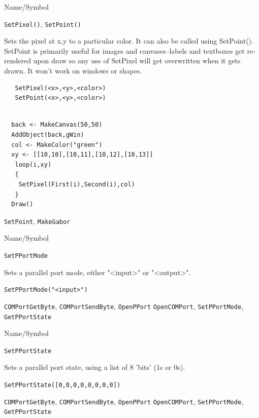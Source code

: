 \begin{desc}{Name/Symbol}
\item[Name/Symbol]	\verb+SetPixel()+, \verb+SetPoint()+

\item[Description] Sets the pixel at x,y to a particular color.  It
  can also be called using SetPoint().  SetPoint is primarily useful
  for images and canvases--labels and textboxes get re-rendered upon
  draw so any use of SetPixel will get overwritten when it gets
  drawn.  It won't work on windows or shapes.

\item[Usage]
\begin{verbatim}
   SetPixel(<x>,<y>,<color>)
   SetPoint(<x>,<y>,<color>)
\end{verbatim}

\item[Example]	
\begin{verbatim}

  back <- MakeCanvas(50,50)
  AddObject(back,gWin)
  col <- MakeColor("green")
  xy <- [[10,10],[10,11],[10,12],[10,13]]
   loop(i,xy)
   {
    SetPixel(First(i),Second(i),col)
   }
  Draw()
\end{verbatim}


\item[See Also]
  \verb+SetPoint+, \verb+MakeGabor+
\end{desc}


\begin{desc}{Name/Symbol}
\item[Name/Symbol] \verb+SetPPortMode+ 

\item[Description]  
  Sets a parallel port mode, either "<input>" or "<output>".
  
\item[Usage]       
     \verb+SetPPortMode("<input>")+ 
\item[Example]

\item[See Also]
\verb+COMPortGetByte+, \verb+COMPortSendByte+, \verb+OpenPPort+ \verb+OpenCOMPort+, \verb+SetPPortMode+, \verb+GetPPortState+ 
\end{desc} 

\begin{desc}{Name/Symbol}
\item[Name/Symbol] \verb+SetPPortState+ 

\item[Description]  
  Sets a parallel port state, using a list of 8 'bits' (1s or 0s).
  
\item[Usage]       
     \verb+SetPPortState([0,0,0,0,0,0,0,0])+ 
\item[Example]


\item[See Also]
\verb+COMPortGetByte+, \verb+COMPortSendByte+, \verb+OpenPPort+ \verb+OpenCOMPort+, \verb+SetPPortMode+, \verb+GetPPortState+ 
\end{desc} 



